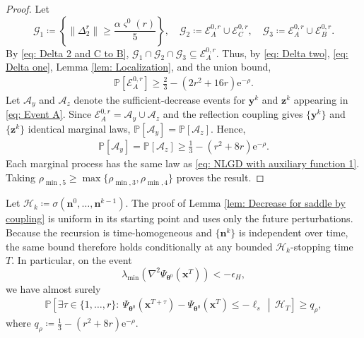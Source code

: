 \documentclass{siamart251216}
\begin{document}
\begin{proof}
    Let
    \[
        \mathcal{G}_{1}\coloneqq\left\{\|\Delta_{2}^{r}\|\geq\frac{\alpha\varsigma^{0}(r)}{5}\right\},\quad
        \mathcal{G}_{2}\coloneqq\mathcal{E}_{A}^{0,r}\cup\mathcal{E}_{C}^{0,r},\quad
        \mathcal{G}_{3}\coloneqq\mathcal{E}_{A}^{0,r}\cup\mathcal{E}_{B}^{0,r}.
    \]
    By \eqref{eq: Delta 2 and C to B}, $\mathcal{G}_{1}\cap\mathcal{G}_{2}\cap\mathcal{G}_{3}\subseteq\mathcal{E}_{A}^{0,r}$. Thus, by \eqref{eq: Delta two}, \eqref{eq: Delta one}, Lemma \ref{lem: Localization}, and the union bound,
    \begin{gather*}
        \mathbb{P}[\mathcal{E}_{A}^{0,r}]
        \geq\frac{2}{3}-(2r^{2}+16r)\mathrm{e}^{-\rho}.
    \end{gather*}
    Let $\mathcal{A}_{y}$ and $\mathcal{A}_{z}$ denote the sufficient-decrease events for $\mathbf{y}^{k}$ and $\mathbf{z}^{k}$ appearing in \eqref{eq: Event A}. Since $\mathcal{E}_{A}^{0,r}=\mathcal{A}_{y}\cup\mathcal{A}_{z}$ and the reflection coupling gives $\{\mathbf{y}^{k}\}$ and $\{\mathbf{z}^{k}\}$ identical marginal laws, $\mathbb{P}[\mathcal{A}_{y}]=\mathbb{P}[\mathcal{A}_{z}]$. Hence,
    \begin{gather*}
        \mathbb{P}[\mathcal{A}_{y}]
        =\mathbb{P}[\mathcal{A}_{z}]
        \geq\frac{1}{3}-(r^{2}+8r)\mathrm{e}^{-\rho}.
    \end{gather*}
    Each marginal process has the same law as \eqref{eq: NLGD with auxiliary function 1}. Taking $\rho_{\min,5}\geq\max\{\rho_{\min,3},\rho_{\min,4}\}$ proves the result.
\end{proof}

Let $\mathcal{H}_{k}\coloneqq\sigma(\mathbf{n}^{0},\ldots,\mathbf{n}^{k-1})$. The proof of Lemma \ref{lem: Decrease for saddle by coupling} is uniform in its starting point and uses only the future perturbations. Because the recursion is time-homogeneous and $\{\mathbf{n}^{k}\}$ is independent over time, the same bound therefore holds conditionally at any bounded $\mathcal{H}_{k}$-stopping time $T$. In particular, on the event
\[
    \lambda_{\min}\!\left(\nabla^{2}\Psi_{\boldsymbol{\theta}^{0}}(\mathbf{x}^{T})\right)<-\epsilon_H,
\]
we have almost surely
\begin{gather}
    \label{eq: conditional saddle decrease}
    \mathbb{P}\left[\exists\tau\in\{1,\ldots,r\}:~
    \Psi_{\boldsymbol{\theta}^{0}}(\mathbf{x}^{T+\tau})-\Psi_{\boldsymbol{\theta}^{0}}(\mathbf{x}^{T})
    \leq-\ell_s\,\middle|\,\mathcal{H}_{T}\right]\geq q_{\rho},
\end{gather}
where $q_{\rho}\coloneqq\frac{1}{3}-(r^{2}+8r)\mathrm{e}^{-\rho}$.
\end{document}
